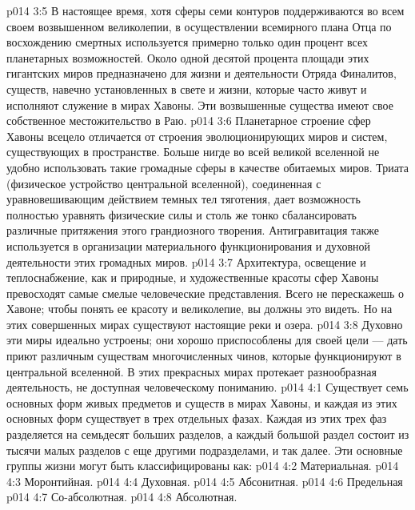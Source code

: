 \vs p014 3:5 В настоящее время, хотя сферы семи контуров поддерживаются во всем своем возвышенном великолепии, в осуществлении всемирного плана Отца по восхождению смертных используется примерно только один процент всех планетарных возможностей. Около одной десятой процента площади этих гигантских миров предназначено для жизни и деятельности Отряда Финалитов, существ, навечно установленных в свете и жизни, которые часто живут и исполняют служение в мирах Хавоны. Эти возвышенные существа имеют свое собственное местожительство в Раю.
\vs p014 3:6 Планетарное строение сфер Хавоны всецело отличается от строения эволюционирующих миров и систем, существующих в пространстве. Больше нигде во всей великой вселенной не удобно использовать такие громадные сферы в качестве обитаемых миров. Триата (физическое устройство центральной вселенной), соединенная с уравновешивающим действием темных тел тяготения, дает возможность полностью уравнять физические силы и столь же тонко сбалансировать различные притяжения этого грандиозного творения. Антигравитация также используется в организации материального функционирования и духовной деятельности этих громадных миров.
\vs p014 3:7 Архитектура, освещение и теплоснабжение, как и природные, и художественные красоты сфер Хавоны превосходят самые смелые человеческие представления. Всего не перескажешь о Хавоне; чтобы понять ее красоту и великолепие, вы должны это видеть. Но на этих совершенных мирах существуют настоящие реки и озера.
\vs p014 3:8 Духовно эти миры идеально устроены; они хорошо приспособлены для своей цели --- дать приют различным существам многочисленных чинов, которые функционируют в центральной вселенной. В этих прекрасных мирах протекает разнообразная деятельность, не доступная человеческому пониманию.
\vs p014 4:1 Существует семь основных форм живых предметов и существ в мирах Хавоны, и каждая из этих основных форм существует в трех отдельных фазах. Каждая из этих трех фаз разделяется на семьдесят больших разделов, а каждый большой раздел состоит из тысячи малых разделов с еще другими подразделами, и так далее. Эти основные группы жизни могут быть классифицированы как:
\vs p014 4:2 \bibnobreakspace Материальная.
\vs p014 4:3 \bibnobreakspace Моронтийная.
\vs p014 4:4 \bibnobreakspace Духовная.
\vs p014 4:5 \bibnobreakspace Абсонитная.
\vs p014 4:6 \bibnobreakspace Предельная
\vs p014 4:7 \bibnobreakspace Со\hyp{}абсолютная.
\vs p014 4:8 \bibnobreakspace Абсолютная.
